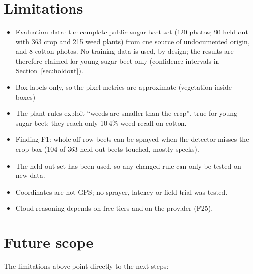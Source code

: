 \section{Limitations}
\begin{itemize}
\item Evaluation data: the complete public sugar beet set (120 photos; 90 held out with 363 crop and
  215 weed plants) from one source of undocumented origin, and 8 cotton photos. No training data is
  used, by design; the results are therefore claimed for young sugar beet only (confidence intervals in
  Section~\ref{sec:holdout}).
\item Box labels only, so the pixel metrics are approximate (vegetation inside boxes).
\item The plant rules exploit ``weeds are smaller than the crop'', true for young sugar beet; they
  reach only 10.4\% weed recall on cotton.
\item Finding F1: whole off-row beets can be sprayed when the detector misses the crop box (104 of 363
  held-out beets touched, mostly specks).
\item The held-out set has been used, so any changed rule can only be tested on new data.
\item Coordinates are not GPS; no sprayer, latency or field trial was tested.
\item Cloud reasoning depends on free tiers and on the provider (F25).
\end{itemize}

\section{Future scope}\label{sec:future}
The limitations above point directly to the next steps:

